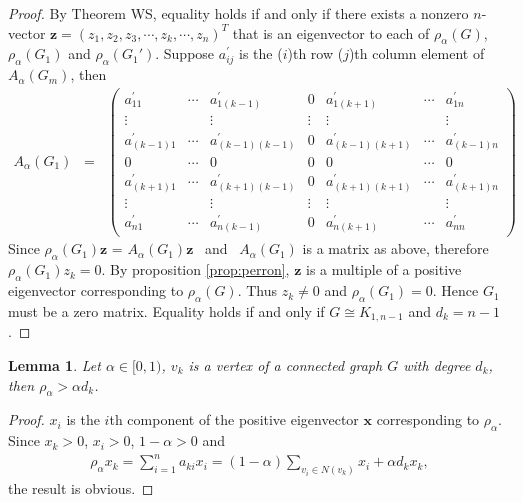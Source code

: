 \documentclass[amsthm]{elsart}
\newtheorem{lemma}{Lemma}[section]
\begin{document}
\begin{proof}
By Theorem WS, equality holds if and only if there exists a nonzero $n$-vector $\textbf{z} = (z_1, z_2,z_3, \cdots,z_k, \cdots, z_n)^T$ that is an eigenvector to each of $\rho _\alpha (G)$, $\rho _\alpha (G_1)$ and $\rho _\alpha (G_1')$. Suppose   $a_{ij}^{\prime}$ is the ($i$)th row ($j$)th column element of $A_\alpha(G_m)$, then 
\begin{eqnarray} \label{matrix:G1}
A_\alpha(G_1) \;\;=\;\;
\begin{pmatrix}
a_{11}^{\prime} & \cdots & a_{1(k-1)}^{\prime} & 0 & a_{1(k+1)}^{\prime} & \cdots & a_{1n}^{\prime} \\
\vdots & {} & \vdots & \vdots & \vdots & {} & \vdots \\
a_{(k-1)1}^{\prime} & \cdots & a_{(k-1)(k-1)}^{\prime} & 0 & a_{(k-1)(k+1)}^{\prime} & \cdots & a_{(k-1)n}^{\prime} \\
0 & \cdots & 0 & 0 & 0 & \cdots & 0 \\
a_{(k+1)1}^{\prime} & \cdots & a_{(k+1)(k-1)}^{\prime} & 0 & a_{(k+1)(k+1)}^{\prime} & \cdots & a_{(k+1)n}^{\prime} \\
\vdots & {} & \vdots & \vdots & \vdots & {} & \vdots \\
a_{n1}^{\prime} & \cdots & a_{n(k-1)}^{\prime} & 0 & a_{n(k+1)}^{\prime} & \cdots & a_{nn}^{\prime}
\end{pmatrix}
\end{eqnarray}
Since $\rho _\alpha (G_1) \textbf{z}$ = $A_\alpha (G_1) \textbf{z}$ \  and \ $A_\alpha (G_1)$ is a matrix as above,
 therefore  $\rho _\alpha (G_1) z_k = 0$. By proposition \ref{prop:perron}, $\textbf{z}$ is a multiple of a positive eigenvector corresponding to $\rho _\alpha (G)$. Thus $z_k \neq 0$ and $\rho _\alpha (G_1) = 0$. Hence $G_1$ must be a zero matrix. Equality holds if and only if $G \cong K_{1,n-1}$ and $d_k = n - 1$.
\end{proof}


\begin{lemma} \label{lem:1}
Let $\alpha \in [0, 1)$, $v_k$ is a vertex of a connected graph $G$ with degree $d_k$, then $\rho _\alpha > \alpha d_k$.
\end{lemma}
\begin{proof}
$x_i$ is the $i$th component of the positive eigenvector $\textbf{x}$ corresponding to $\rho_\alpha$. Since $x_k > 0$, $x_i > 0$, $1-\alpha > 0$ and
\begin{eqnarray*}
\rho _\alpha x_k = \sum \limits_{i = 1}^{n} a_{ki} x_i = (1 - \alpha) \sum \limits_{v_i \in N(v_k)}^{} x_i + \alpha d_k x_k ,
\end{eqnarray*}
the result is obvious.
\end{proof}
\end{document}
